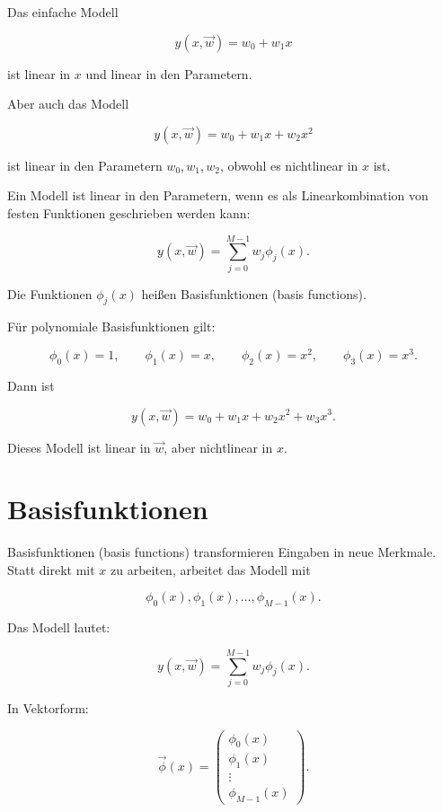 Das einfache Modell

\[
    y(x,\vec{w})
    =
    w_0+w_1x
\]

ist linear in \(x\) und linear in den Parametern.

Aber auch das Modell

\[
    y(x,\vec{w})
    =
    w_0
    +
    w_1x
    +
    w_2x^2
\]

ist linear in den Parametern \(w_0,w_1,w_2\), obwohl es nichtlinear in \(x\) ist.

\begin{definitionbox}
Ein Modell ist linear in den Parametern, wenn es als Linearkombination von festen Funktionen geschrieben werden kann:

\[
    y(x,\vec{w})
    =
    \sum_{j=0}^{M-1}
    w_j \phi_j(x).
\]

Die Funktionen \(\phi_j(x)\) heißen Basisfunktionen (basis functions).
\end{definitionbox}

\begin{examplebox}
Für polynomiale Basisfunktionen gilt:

\[
    \phi_0(x)=1,
    \qquad
    \phi_1(x)=x,
    \qquad
    \phi_2(x)=x^2,
    \qquad
    \phi_3(x)=x^3.
\]

Dann ist

\[
    y(x,\vec{w})
    =
    w_0
    +
    w_1x
    +
    w_2x^2
    +
    w_3x^3.
\]

Dieses Modell ist linear in \(\vec{w}\), aber nichtlinear in \(x\).
\end{examplebox}

\section{Basisfunktionen}

Basisfunktionen (basis functions) transformieren Eingaben in neue Merkmale.
Statt direkt mit \(x\) zu arbeiten, arbeitet das Modell mit

\[
    \phi_0(x),\phi_1(x),\dots,\phi_{M-1}(x).
\]

Das Modell lautet:

\[
    y(x,\vec{w})
    =
    \sum_{j=0}^{M-1}
    w_j\phi_j(x).
\]

In Vektorform:

\[
    \vec{\phi}(x)
    =
    \begin{pmatrix}
        \phi_0(x) \\
        \phi_1(x) \\
        \vdots \\
        \phi_{M-1}(x)
    \end{pmatrix}.
\]

